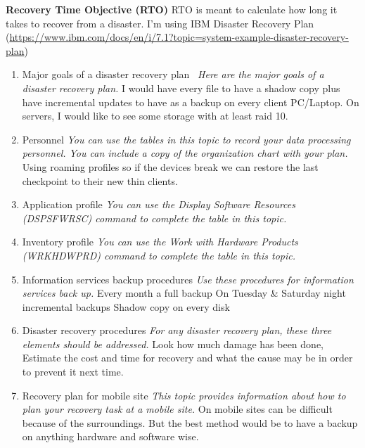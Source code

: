 \documentclass[12pt, letterpaper]{article}
\begin{document}
\hfill\break
\textbf{Recovery Time Objective (RTO)}
\hfill\break
RTO is meant to calculate how long it takes to recover from a disaster. 
\hfill\break
\hfill\break
I'm using IBM Disaster Recovery Plan (\url{https://www.ibm.com/docs/en/i/7.1?topic=system-example-disaster-recovery-plan})
\begin{enumerate}
\item Major goals of a disaster recovery plan\
\hfill\break
\textit{Here are the major goals of a disaster recovery plan.}
\hfill\break
I would have every file to have a shadow copy plus have incremental updates to have as a backup on every client PC/Laptop. On servers, I would like to see some storage with at least raid 10.

\item Personnel
\hfill\break
\textit{You can use the tables in this topic to record your data processing personnel. You can include a copy of the organization chart with your plan.}
Using roaming profiles so if the devices break we can restore the last checkpoint to their new thin clients.

\item Application profile
\hfill\break
\textit{You can use the Display Software Resources (DSPSFWRSC) command to complete the table in this topic.}

\item Inventory profile
\hfill\break
\textit{You can use the Work with Hardware Products (WRKHDWPRD) command to complete the table in this topic.}

\item Information services backup procedures
\hfill\break
\textit{Use these procedures for information services back up.}
\hfill\break
Every month a full backup
\hfill\break
On Tuesday \& Saturday night incremental backups 
\hfill\break
Shadow copy on every disk

\item Disaster recovery procedures
\hfill\break
\textit{For any disaster recovery plan, these three elements should be addressed.}
Look how much damage has been done, Estimate the cost and time for recovery and what the cause may be in order to prevent it next time.
\item Recovery plan for mobile site
\hfill\break
\textit{This topic provides information about how to plan your recovery task at a mobile site.}
\hfill\break
On mobile sites can be difficult because of the surroundings. But the best method would be to have a backup on anything hardware and software wise.


\end{enumerate}
\end{document}
